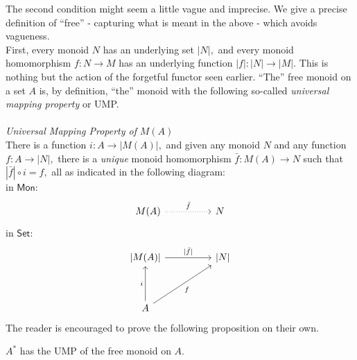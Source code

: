 The second condition might seem a little vague and imprecise. We give a precise definition of ``free'' - capturing what is meant in the above - which avoids vagueness.\\
First, every monoid $N$ has an underlying set $|N|,$ and every monoid homomorphism $f:N\to M$ has an underlying function $|f|:|N| \to |M|.$ This is nothing but the action of the forgetful functor seen earlier. ``The'' free monoid on a set $A$ is, by definition, ``the'' monoid with the following so-called \emph{universal mapping property} or UMP.\\\\
\emph{Universal Mapping Property of }$M(A)$\\
There is a function $i:A\to |M(A)|,$ and given any monoid $N$ and any function $f:A\to |N|,$ there is a \emph{unique} monoid homomorphism $\bar{f}:M(A) \to N$ such that $|\bar{f}|\circ i = f,$ all as indicated in the following diagram:\\
in $\mathsf{Mon}$:
\begin{equation*} 
	\begin{tikzcd}
		M(A) \arrow[rr, dotted, "\bar{f}"] && N
	\end{tikzcd}
\end{equation*}
in $\mathsf{Set}$:
\begin{equation*} 
	\begin{tikzcd}
	{\vert}M(A){\vert} \arrow[rr, "{\vert}\bar{f}{\vert}"]&  & {\vert}N{\vert} \\
	                                     &  &     \\
	A \arrow[uu, "i"] \arrow[rruu, "f"'] &  &    
	\end{tikzcd}
\end{equation*}
The reader is encouraged to prove the following proposition on their own.
\begin{prop}
	$A^*$ has the UMP of the free monoid on $A.$
\end{prop}
